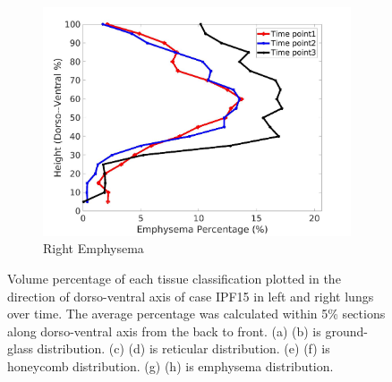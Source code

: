 \begin{figure}[H]
\begin{subfigure}{.42\linewidth}
  \includegraphics[width=\linewidth,trim={{.0\wd0} {.0\wd0} {.0\wd0} {.0\wd0}},clip]{Appendix/Image_AppexA/DorsoToVentral/IPF15RightLungEmphysemaDiseaseDorsoToVentral.jpg}
  \caption{Right Emphysema}
  \label{fig:IPF15DiseaseDorsoToVentral-h}
\end{subfigure}
\caption{Volume percentage of each tissue classification plotted in the direction of dorso-ventral axis of case IPF15 in left and right lungs over time. The average percentage was calculated within 5\% sections along dorso-ventral axis from the back to front. (a) (b) is ground-glass distribution. (c) (d) is reticular distribution. (e) (f) is honeycomb distribution. (g) (h) is emphysema distribution.}
\label{fig:IPF15DiseaseDorsoToVentral}
\end{figure}


